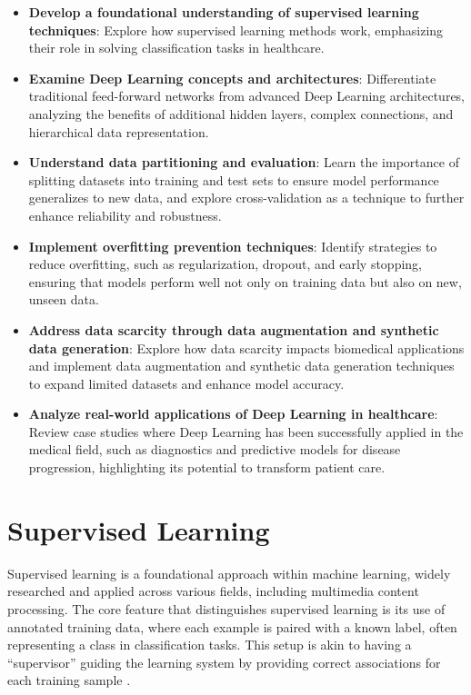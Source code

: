 \documentclass{article}
\begin{document}
\begin{itemize}
	\item \textbf{Develop a foundational understanding of supervised learning techniques}: Explore how supervised learning methods work, emphasizing their role in solving classification tasks in healthcare.
	
	\item \textbf{Examine Deep Learning concepts and architectures}: Differentiate traditional feed-forward networks from advanced Deep Learning architectures, analyzing the benefits of additional hidden layers, complex connections, and hierarchical data representation.
	
	\item \textbf{Understand data partitioning and evaluation}: Learn the importance of splitting datasets into training and test sets to ensure model performance generalizes to new data, and explore cross-validation as a technique to further enhance reliability and robustness.
	
	\item \textbf{Implement overfitting prevention techniques}: Identify strategies to reduce overfitting, such as regularization, dropout, and early stopping, ensuring that models perform well not only on training data but also on new, unseen data.
	
	\item \textbf{Address data scarcity through data augmentation and synthetic data generation}: Explore how data scarcity impacts biomedical applications and implement data augmentation and synthetic data generation techniques to expand limited datasets and enhance model accuracy.
	
	\item \textbf{Analyze real-world applications of Deep Learning in healthcare}: Review case studies where Deep Learning has been successfully applied in the medical field, such as diagnostics and predictive models for disease progression, highlighting its potential to transform patient care.
\end{itemize}



\section{Supervised Learning}

Supervised learning is a foundational approach within machine learning, widely researched and applied across various fields, including multimedia content processing. The core feature that distinguishes supervised learning is its use of annotated training data, where each example is paired with a known label, often representing a class in classification tasks. This setup is akin to having a “supervisor” guiding the learning system by providing correct associations for each training sample \cite{Cunningham2008}. 
\end{document}
